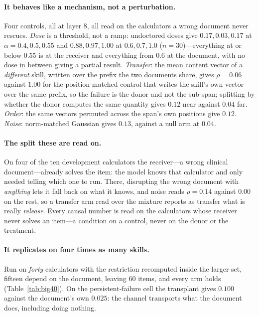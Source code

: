 \documentclass{article}
\begin{document}
\paragraph{It behaves like a mechanism, not a perturbation.} Four controls, all
at layer 8, all read on the calculators a wrong document never rescues.
\emph{Dose} is a threshold, not a ramp: undoctored doses give $0.17, 0.03, 0.17$
at $\alpha = 0.4, 0.5, 0.55$ and $0.88, 0.97, 1.00$ at $0.6, 0.7, 1.0$
($n=30$)---everything at or below $0.55$ is at the receiver and everything from
$0.6$ at the document, with no dose in between giving a partial result.
\emph{Transfer}: the mean content vector of a \emph{different} skill, written
over the prefix the two documents share, gives $\rho = 0.06$ against $1.00$ for
the position-matched control that writes the skill's own vector over the same
prefix, so the failure is the donor and not the sub-span; splitting by whether
the donor computes the same quantity gives $0.12$ near against $0.04$ far.
\emph{Order}: the same vectors permuted across the span's own positions give
$0.12$. \emph{Noise}: norm-matched Gaussian gives $0.13$, against a null arm at
$0.04$.

\paragraph{The split these are read on.} On four of the ten development
calculators the receiver---a wrong clinical document---already solves the item:
the model knows that calculator and only needed telling which one to run. There,
disrupting the wrong document with \emph{anything} lets it fall back on what it
knows, and noise reads $\rho = 0.14$ against $0.00$ on the rest, so a transfer
arm read over the mixture reports as transfer what is really \emph{release}.
Every causal number is read on the calculators whose receiver never solves an
item---a condition on a control, never on the donor or the treatment.

\paragraph{It replicates on four times as many skills.} Run on \emph{forty}
calculators with the restriction recomputed inside the larger set, fifteen
depend on the document, leaving $60$ items, and every arm holds
(Table~\ref{tab:big40}). On the persistent-failure cell the transplant gives
$0.100$ against the document's own $0.025$: the channel transports what the
document does, including doing nothing.
\end{document}
